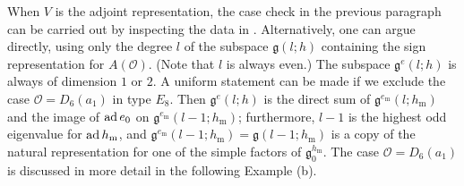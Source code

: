 \documentclass{amsart}
\theoremstyle{definition}
\newcommand{\m}{\mathrm{m}}
\newcommand{\g}{\mathfrak{g}}
\newcommand{\0}{\mathcal{O}}
\begin{document}

When $V$ is the adjoint representation, the case check in the previous paragraph can be carried out by inspecting the data in \cite{Lawther-Testerman}.
Alternatively, one can argue directly, using only the degree $l$ of the subspace $\g(l;h)$ containing the sign representation for $A(\0)$.
(Note that $l$ is always even.)
The subspace $\g^e(l;h)$ is always of dimension $1$ or $2$.
A uniform statement can be made if we exclude the case $\0=D_6(a_1)$ in type $E_8$.
Then $\g^e(l;h)$ is the direct sum of $\g^{e_\m}(l;h_\m)$ and the image of ${\rm ad}\, e_0$ on $\g^{e_\m}(l-1;h_\m)$; furthermore, $l-1$ is the highest odd eigenvalue for ${\rm ad}\, h_\m$, and $\g^{e_\m}(l-1;h_\m)=\g(l-1;h_\m)$ is a copy of the natural representation for one of the simple factors of $\g_0^{h_\m}$.
The case $\0=D_6(a_1)$ is discussed in more detail in the following Example (b).

\end{document}
